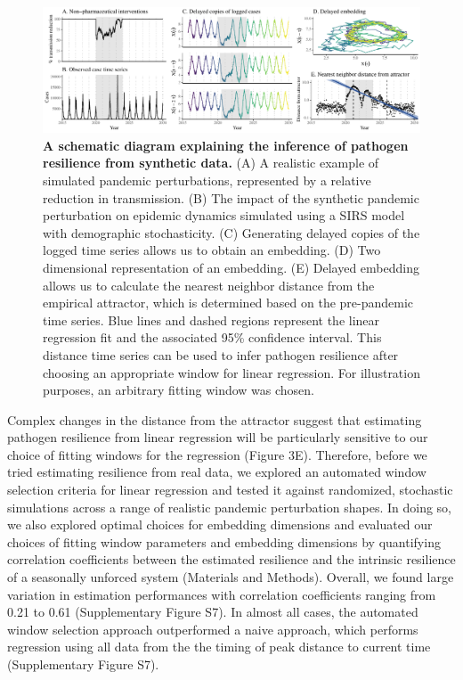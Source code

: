 \documentclass[12pt]{article}
\begin{document}
\begin{figure}[!ht]
\includegraphics[width=\textwidth]{../figure3/figure3.pdf}
\caption{
\textbf{A schematic diagram explaining the inference of pathogen resilience from synthetic data.}
(A) A realistic example of simulated pandemic perturbations, represented by a relative reduction in transmission.
(B) The impact of the synthetic pandemic perturbation on epidemic dynamics simulated using a SIRS model with demographic stochasticity.
(C) Generating delayed copies of the logged time series allows us to obtain an embedding.
(D) Two dimensional representation of an embedding.
(E) Delayed embedding allows us to calculate the nearest neighbor distance from the empirical attractor, which is determined based on the pre-pandemic time series.
Blue lines and dashed regions represent the linear regression fit and the associated 95\% confidence interval.
This distance time series can be used to infer pathogen resilience after choosing an appropriate window for linear regression.
For illustration purposes, an arbitrary fitting window was chosen.
}
\end{figure}

Complex changes in the distance from the attractor suggest that estimating pathogen resilience from linear regression will be particularly sensitive to our choice of fitting windows for the regression (Figure 3E).
Therefore, before we tried estimating resilience from real data, we explored an automated window selection criteria for linear regression and tested it against randomized, stochastic simulations across a range of realistic pandemic perturbation shapes.
In doing so, we also explored optimal choices for embedding dimensions and evaluated our choices of fitting window parameters and embedding dimensions by quantifying correlation coefficients between the estimated resilience and the intrinsic resilience of a seasonally unforced system (Materials and Methods).
Overall, we found large variation in estimation performances with correlation coefficients ranging from 0.21 to 0.61 (Supplementary Figure S7).
In almost all cases, the automated window selection approach outperformed a naive approach, which performs regression using all data from the the timing of peak distance to current time (Supplementary Figure S7).
\end{document}

